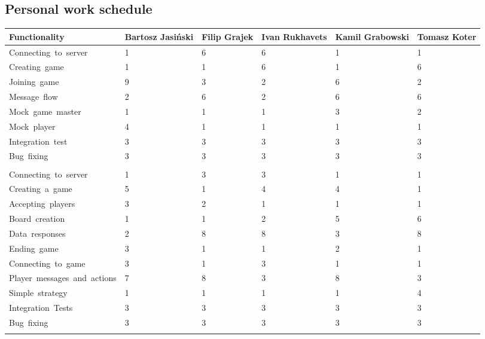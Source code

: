 \documentclass[11pt,a4paper]{article}
\begin{document}

\subsection{Personal work schedule}

\begin{tabular}{ | p{4cm} | p{2cm} | p{2cm} | p{2cm} | p{2cm} | p{2cm} | }
\hline
	\textbf{Functionality} & \textbf{Bartosz Jasiński} & \textbf{Filip Grajek} & \textbf{Ivan Rukhavets} & \textbf{Kamil Grabowski} & \textbf{Tomasz Koter}\\ \hline
	Connecting\ to\ server & 1 & 6 & 6 & 1 & 1   \\ \hline
	Creating\ game & 1 & 1 & 6 & 1 & 6   \\ \hline
	Joining\ game & 9 & 3 & 2 & 6 & 2   \\ \hline
	Message\ flow & 2 & 6 & 2 & 6 & 6   \\ \hline
	Mock\ game\ master & 1 & 1 & 1 & 3 & 2   \\ \hline
	Mock\ player & 4 & 1 & 1 & 1 & 1   \\ \hline
	Integration\ test & 3 & 3 & 3 & 3 & 3   \\ \hline
	Bug\ fixing & 3 & 3 & 3 & 3 & 3  \\ \hline
	 &  &  &  &  &   \\ \hline

	Connecting\ to\ server & 1 & 3 & 3 & 1 & 1    \\ \hline
	Creating\ a\ game & 5 & 1 & 4 & 4 & 1   \\ \hline
	Accepting\ players & 3 & 2 & 1 & 1 & 1   \\ \hline
	Board\ creation & 1 & 1 & 2 & 5 & 6    \\ \hline
	Data\ responses & 2 & 8 & 8 & 3 & 8   \\ \hline
	Ending\ game & 3 & 1 & 1 & 2 & 1   \\ \hline
	Connecting\ to\ game & 3 & 1 & 3 & 1 & 1   \\ \hline
	Player\ messages\ and\ actions & 7 & 8 & 3 & 8 & 3\  \\ \hline
	Simple\ strategy & 1 & 1 & 1 & 1 & 4   \\ \hline
	Integration\ Tests & 3 & 3 & 3 & 3 & 3   \\ \hline
	Bug\ fixing & 3 & 3 & 3 & 3 & 3   \\ \hline
	 &  &  &  &  &  \\ \hline
	

\end{tabular}
\end{document}
